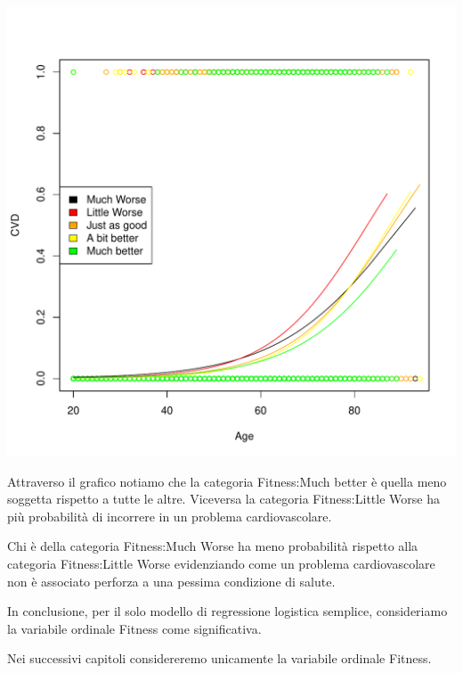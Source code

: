 \documentclass{article}\usepackage[]{graphicx}\usepackage[]{xcolor}
\makeatletter
\def\maxwidth{ %
  \ifdim\Gin@nat@width>\linewidth
    \linewidth
  \else
    \Gin@nat@width
  \fi
}
\newenvironment{knitrout}{}{} %
\makeatother
\begin{document}
\begin{knitrout}
\includegraphics[width=\maxwidth]{figure/RLS_Fitness_Plot-1} 
\end{knitrout}
    
    Attraverso il grafico notiamo che la categoria Fitness:Much better è quella meno
    soggetta rispetto a tutte le altre. Viceversa la categoria Fitness:Little Worse 
    ha più probabilità di incorrere in un problema cardiovascolare. \par
    
    Chi è della categoria Fitness:Much Worse ha meno probabilità rispetto alla          categoria Fitness:Little Worse evidenziando come un problema cardiovascolare
    non è associato perforza a una pessima condizione di salute. \par
    
    In conclusione, per il solo modello di regressione logistica semplice,
    consideriamo la variabile ordinale Fitness come significativa.\par
    
    Nei successivi capitoli considereremo unicamente la variabile ordinale 
    Fitness.
    
  \clearpage
\end{document}
